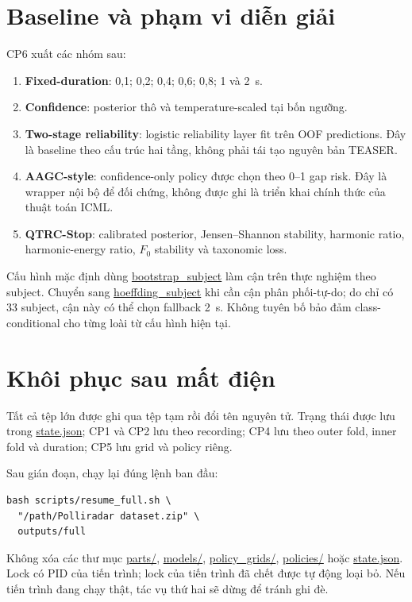 \documentclass[12pt,draftclsnofoot,onecolumn]{IEEEtran}
\newcommand{\code}[1]{\url{#1}}
\begin{document}
\section{Baseline và phạm vi diễn giải}

CP6 xuất các nhóm sau:
\begin{enumerate}[leftmargin=*]
\item \textbf{Fixed-duration}: 0,1; 0,2; 0,4; 0,6; 0,8; 1 và 2~s.
\item \textbf{Confidence}: posterior thô và temperature-scaled tại bốn ngưỡng.
\item \textbf{Two-stage reliability}: logistic reliability layer fit trên OOF predictions. Đây là baseline theo cấu trúc hai tầng, không phải tái tạo nguyên bản TEASER.
\item \textbf{AAGC-style}: confidence-only policy được chọn theo 0--1 gap risk. Đây là wrapper nội bộ để đối chứng, không được ghi là triển khai chính thức của thuật toán ICML.
\item \textbf{QTRC-Stop}: calibrated posterior, Jensen--Shannon stability, harmonic ratio, harmonic-energy ratio, $F_0$ stability và taxonomic loss.
\end{enumerate}

Cấu hình mặc định dùng \code{bootstrap_subject} làm cận trên thực nghiệm theo subject. Chuyển sang \code{hoeffding_subject} khi cần cận phân phối-tự-do; do chỉ có 33 subject, cận này có thể chọn fallback 2~s. Không tuyên bố bảo đảm class-conditional cho từng loài từ cấu hình hiện tại.

\section{Khôi phục sau mất điện}

Tất cả tệp lớn được ghi qua tệp tạm rồi đổi tên nguyên tử. Trạng thái được lưu trong \code{state.json}; CP1 và CP2 lưu theo recording; CP4 lưu theo outer fold, inner fold và duration; CP5 lưu grid và policy riêng.

Sau gián đoạn, chạy lại đúng lệnh ban đầu:
\begin{lstlisting}
bash scripts/resume_full.sh \
  "/path/Polliradar dataset.zip" \
  outputs/full
\end{lstlisting}

Không xóa các thư mục \code{parts/}, \code{models/}, \code{policy_grids/}, \code{policies/} hoặc \code{state.json}. Lock có PID của tiến trình; lock của tiến trình đã chết được tự động loại bỏ. Nếu tiến trình đang chạy thật, tác vụ thứ hai sẽ dừng để tránh ghi đè.
\end{document}
